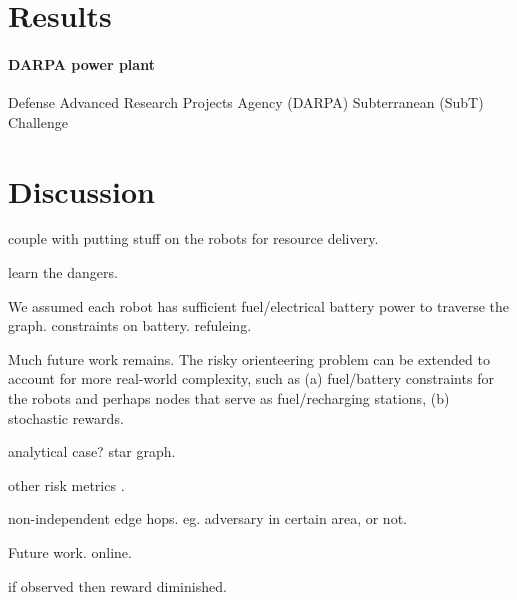 \documentclass[11pt, oneside]{article}
\begin{document}
\section{Results}

\paragraph{DARPA power plant}

Defense Advanced Research Projects Agency (DARPA) Subterranean (SubT) Challenge \cite{chung2023into}


\section{Discussion}

couple with putting stuff on the robots for resource delivery.

learn the dangers.

We assumed each robot has sufficient fuel/electrical battery power to traverse the graph.
constraints on battery. refuleing.

Much future work remains.
The risky orienteering problem can be extended to account for more real-world complexity, such as (a) fuel/battery constraints for the robots and perhaps nodes that serve as fuel/recharging stations, (b) stochastic rewards.


analytical case? star graph.

other risk metrics \cite{majumdar2020should}.

non-independent edge hops. eg. adversary in certain area, or not.

Future work. online.

if observed then reward diminished.




\end{document}
